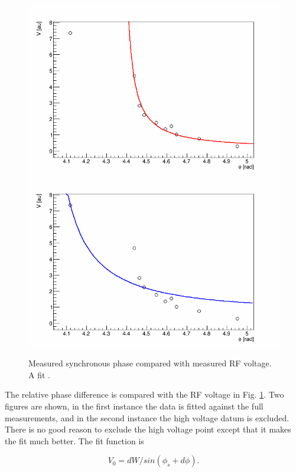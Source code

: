 \documentclass{paper}
\begin{document}
\begin{figure}
	\centering
		\includegraphics[width=\textwidth]{images/synchronous_phase_vs_voltage_cut}
		\includegraphics[width=\textwidth]{images/synchronous_phase_vs_voltage_unweighted}
	\caption{Measured synchronous phase compared with measured RF voltage. A fit .}
	\label{fig:synchronous_phase_vs_voltage}
\end{figure}


The relative phase difference is compared with the RF voltage in Fig. 
\ref{fig:synchronous_phase_vs_voltage}. Two figures are shown, in the first
instance the data is fitted against the full measurements, and in the second
instance the high voltage datum is excluded. There is no good reason to exclude 
the high voltage point except that it makes the fit much better. The fit 
function is

\begin{equation}
V_0 = dW/sin(\phi_s+d\phi).
\end{equation}
\end{document}
